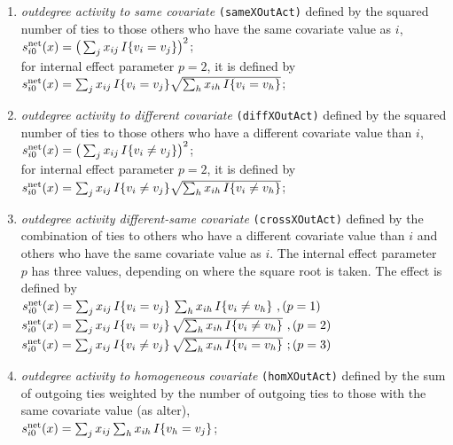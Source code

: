 \documentclass[a4paper,fleqn,11pt]{article}
\newcommand{\+}{\, + \,}
\newcommand{\vit}{\theenumi}
\begin{document}
\begin{enumerate}
 \item {\em outdegree activity to same covariate}
\texttt{(sameXOutAct)} defined by the
 squared number of ties to those
 others who have the same covariate value as $i$,\\
 $s^{\rm net}_{i\vit}(x) =  \big( \sum_j x_{ij} \, I\{v_i = v_j \}\big)^2 $;\\
 for internal effect parameter $p=2$, it is defined by\\
 $s^{\rm net}_{i\vit}(x) =  \sum_j x_{ij} \, I\{v_i = v_j \}
            \sqrt{\sum_h x_{ih}\, I\{v_i = v_h \}} $;\\

 \item {\em outdegree activity to different covariate}
\texttt{(diffXOutAct)} defined by the
 squared number of ties to those
 others who have a different covariate value than $i$,\\
 $s^{\rm net}_{i\vit}(x) = \big(\sum_j x_{ij} \,I\{v_i \neq v_j \}\big)^2 $;\\
 for internal effect parameter $p=2$, it is defined by\\
 $s^{\rm net}_{i\vit}(x) =  \sum_j x_{ij} \, I\{v_i \neq v_j \}
             \sqrt{\sum_h x_{ih}\, I\{v_i \neq v_h \}} $;\\


 \item {\em outdegree activity different-same covariate}
\texttt{(crossXOutAct)} defined by the
  combination of ties to others who have a different covariate value than $i$
  and others who have the same covariate value as $i$.
  The internal effect parameter $p$ has three values,
  depending on where the square root is taken.
  The effect is defined by \\
 $s^{\rm net}_{i\vit}(x) =  \sum_j x_{ij} \, I\{v_i = v_j \} \,
             \sum_h x_{ih}\, I\{v_i \neq v_h \} \ , \hfill (p=1) $\\[0.4em]
 $s^{\rm net}_{i\vit}(x) =  \sum_j x_{ij} \, I\{v_i = v_j \} \,
            \sqrt{ \sum_h x_{ih}\, I\{v_i \neq v_h \} } \ ,  \hfill (p=2)$\\[0.4em]
 $s^{\rm net}_{i\vit}(x) =  \sum_j x_{ij} \, I\{v_i \neq v_j \} \,
            \sqrt{ \sum_h x_{ih}\, I\{v_i = v_h \} }  \ ;  \hfill (p=3)$\\


 \item {\em outdegree activity to homogeneous covariate}
\texttt{(homXOutAct)} defined by the
 sum of outgoing ties weighted by the number of outgoing
 ties to those with the same covariate value (as alter),\\
 $s^{\rm net}_{i\vit}(x) = \sum_j x_{ij} \sum_h x_{ih} \,I\{v_h = v_j \} $;



\end{enumerate}
\end{document}
